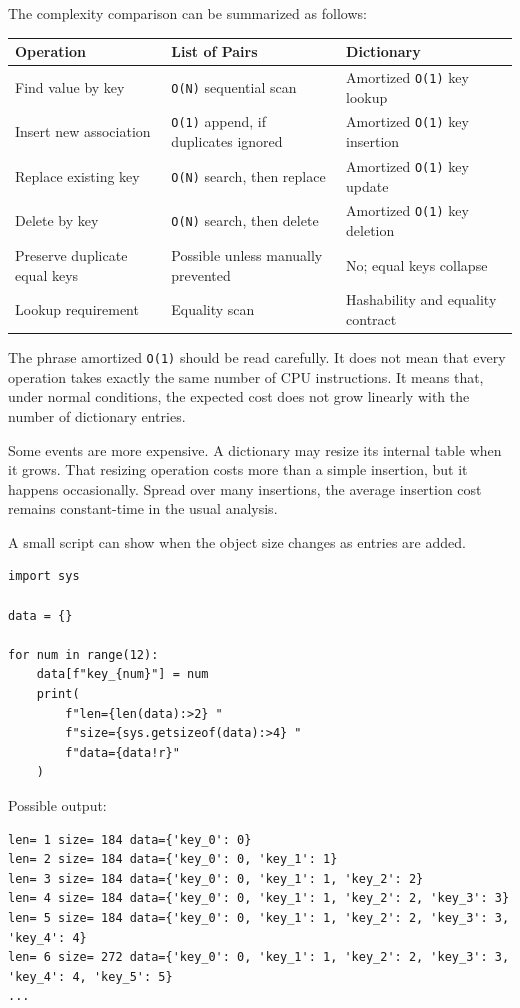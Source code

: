 The complexity comparison can be summarized as follows:

\begin{center}
\begin{tabular}{lll}
\textbf{Operation} & \textbf{List of Pairs} & \textbf{Dictionary} \\
\hline
Find value by key & \texttt{O(N)} sequential scan & Amortized \texttt{O(1)} key lookup \\
Insert new association & \texttt{O(1)} append, if duplicates ignored & Amortized \texttt{O(1)} key insertion \\
Replace existing key & \texttt{O(N)} search, then replace & Amortized \texttt{O(1)} key update \\
Delete by key & \texttt{O(N)} search, then delete & Amortized \texttt{O(1)} key deletion \\
Preserve duplicate equal keys & Possible unless manually prevented & No; equal keys collapse \\
Lookup requirement & Equality scan & Hashability and equality contract \\
\end{tabular}
\end{center}

The phrase amortized \texttt{O(1)} should be read carefully. It does not mean that every operation takes exactly the same number of CPU instructions. It means that, under normal conditions, the expected cost does not grow linearly with the number of dictionary entries.

Some events are more expensive. A dictionary may resize its internal table when it grows. That resizing operation costs more than a simple insertion, but it happens occasionally. Spread over many insertions, the average insertion cost remains constant-time in the usual analysis.

A small script can show when the object size changes as entries are added.

\begin{verbatim}
import sys

data = {}

for num in range(12):
    data[f"key_{num}"] = num
    print(
        f"len={len(data):>2} "
        f"size={sys.getsizeof(data):>4} "
        f"data={data!r}"
    )
\end{verbatim}

Possible output:

\begin{verbatim}
len= 1 size= 184 data={'key_0': 0}
len= 2 size= 184 data={'key_0': 0, 'key_1': 1}
len= 3 size= 184 data={'key_0': 0, 'key_1': 1, 'key_2': 2}
len= 4 size= 184 data={'key_0': 0, 'key_1': 1, 'key_2': 2, 'key_3': 3}
len= 5 size= 184 data={'key_0': 0, 'key_1': 1, 'key_2': 2, 'key_3': 3, 'key_4': 4}
len= 6 size= 272 data={'key_0': 0, 'key_1': 1, 'key_2': 2, 'key_3': 3, 'key_4': 4, 'key_5': 5}
...
\end{verbatim}

